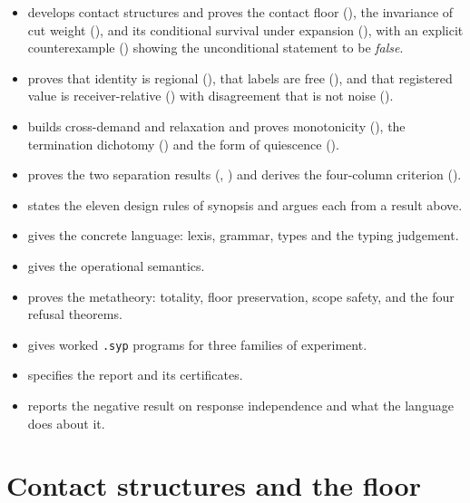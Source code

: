 \documentclass[11pt,twocolumn,a4paper]{article}
\theoremstyle{plain}
\theoremstyle{definition}
\theoremstyle{remark}
\begin{document}
\begin{itemize}[leftmargin=1.4em]
\item {} develops contact structures and proves the
      contact floor (), the invariance of cut weight
      (), and its conditional survival under
      expansion (), with an explicit counterexample
      () showing the unconditional statement to
      be \emph{false}.
\item {} proves that identity is regional
      (), that labels are free (),
      and that registered value is receiver-relative
      () with disagreement that is not noise
      ().
\item {} builds cross-demand and relaxation and proves
      monotonicity (), the termination dichotomy
      () and the form of quiescence
      ().
\item {} proves the two separation results
      (, ) and derives the
      four-column criterion ().
\item {} states the eleven design rules of synopsis and
      argues each from a result above.
\item {} gives the concrete language: lexis, grammar, types
      and the typing judgement.
\item {} gives the operational semantics.
\item {} proves the metatheory: totality, floor
      preservation, scope safety, and the four refusal theorems.
\item {} gives worked \texttt{.syp} programs for three
      families of experiment.
\item {} specifies the report and its certificates.
\item {} reports the negative result on response
      independence and what the language does about it.
\end{itemize}

\section{Contact structures and the floor}
\label{sec:contact}
\end{document}
